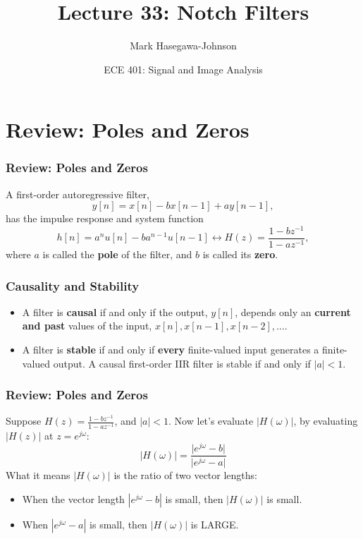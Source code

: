 \documentclass{beamer}
\title{Lecture 33: Notch Filters}
\author{Mark Hasegawa-Johnson}
\date{ECE 401: Signal and Image Analysis}
\begin{document}
\begin{frame}
  \maketitle
\end{frame}

\begin{frame}
  \tableofcontents
\end{frame}

\section[Review]{Review: Poles and Zeros}
\setcounter{subsection}{1}

\begin{frame}
  \frametitle{Review: Poles and Zeros}
  A first-order autoregressive filter,
  \[
  y[n] = x[n]-bx[n-1]+ay[n-1],
  \]
  has the impulse response and system function
  \[
  h[n]=a^n u[n]-ba^{n-1}u[n-1] \leftrightarrow H(z)  = \frac{1-bz^{-1}}{1-az^{-1}},
  \]
  where $a$ is called the {\bf pole} of the filter, and $b$ is called
  its {\bf zero}.
\end{frame}

\begin{frame}
  \frametitle{Causality and Stability}
  \begin{itemize}
  \item A filter is {\bf causal} if and only if the output, $y[n]$,
    depends only an {\bf current and past} values of the input, $x[n],
    x[n-1],x[n-2],\ldots$.
  \item A filter is {\bf stable} if and only if {\bf every}
    finite-valued input generates a finite-valued output.  A causal
    first-order IIR filter is stable if and only if $|a|<1$.
  \end{itemize}
\end{frame}

\begin{frame}
  \frametitle{Review: Poles and Zeros}

  Suppose $H(z)=\frac{1-bz^{-1}}{1-az^{-1}}$, and $|a|<1$.  Now let's
  evaluate $|H(\omega)|$, by evaluating $|H(z)|$ at $z=e^{j\omega}$:
  \[
  \vert H(\omega)\vert = 
  \frac{\vert e^{j\omega}-b\vert}{\vert e^{j\omega}-a\vert}
  \]
  What it means $|H(\omega)|$ is the ratio of two vector lengths:
  \begin{itemize}
  \item When the vector length $|e^{j\omega}-b|$ is small, then
    $|H(\omega)|$ is small.
  \item When $|e^{j\omega}-a|$ is small, then $|H(\omega)|$ is LARGE.
  \end{itemize}
\end{frame}
\end{document}
